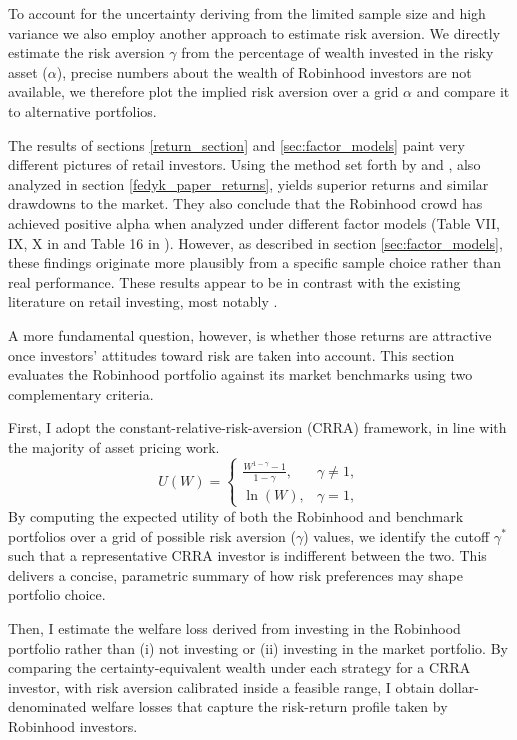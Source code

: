 To account for the uncertainty deriving from the limited sample size and high variance we also employ another approach to estimate risk aversion. 
We directly estimate the risk aversion $\gamma$ from the percentage of wealth invested in the risky asset ($\alpha$), 
precise numbers about the wealth of Robinhood investors are not available, we therefore plot the implied risk aversion over a grid $\alpha$ and compare it to alternative portfolios.

The results of sections \ref{return_section} and \ref{sec:factor_models} paint very different pictures of retail investors.  
Using the method set forth by \cite{Welch2022} and \cite{Fedyk2024}, also analyzed in section \ref{fedyk_paper_returns}, yields superior returns and similar drawdowns to the market.  
They also conclude that the Robinhood crowd has achieved positive alpha when analyzed under different factor models (Table VII, IX, X in \cite{Welch2022} and Table 16 in \cite{Fedyk2024}).  
However, as described in section \ref{sec:factor_models}, these findings originate more plausibly from a specific sample choice rather than real performance.  
These results appear to be in contrast with the existing literature on retail investing, most notably \cite{BarberOdean2000}.  

A more fundamental question, however, is whether those returns are attractive once investors’ attitudes toward risk are taken into account.  
This section evaluates the Robinhood portfolio against its market benchmarks using two complementary criteria.  

First, I adopt the constant-relative-risk-aversion (CRRA) framework, in line with the majority of asset pricing work.  
\begin{equation}
    U(W) = 
    \begin{cases}
    \frac{W^{1-\gamma}-1}{1-\gamma}, & \gamma \neq 1,\\
    \ln(W), & \gamma = 1,
    \end{cases}
    \label{CRRA}
\end{equation}
By computing the expected utility of both the Robinhood and benchmark portfolios over a grid of possible risk aversion ($\gamma$) values, 
we identify the cutoff $\gamma^*$ such that a representative CRRA investor is indifferent between the two. 
This delivers a concise, parametric summary of how risk preferences may shape portfolio choice.  

Then, I estimate the welfare loss derived from investing in the Robinhood portfolio rather than (i) not investing or (ii) investing in the market portfolio.  
By comparing the certainty-equivalent wealth under each strategy for a CRRA investor, with risk aversion calibrated inside a feasible range, I obtain dollar-denominated welfare losses that capture the risk-return profile taken by Robinhood investors.  

